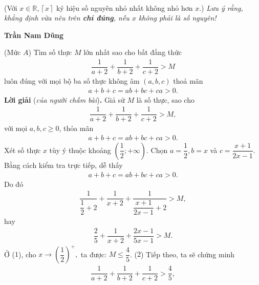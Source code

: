 \begin{multicols}{2}
\begin{align*}
	\end{align*}
	(Với $x \in \mathbb{R}, \left\lceil x \right\rceil $    ký hiệu số nguyên nhỏ nhất không nhỏ hơn $x$.)
	\vskip 0.05cm
	\textit{Lưu ý rằng, khẳng định vừa nêu trên \textbf{\color{thachthuctoanhoc}chỉ đúng}, nếu $x$ không phải là số nguyên!}
	\begin{flushright}
		\textbf{\color{thachthuctoanhoc}Trần Nam Dũng}
	\end{flushright}
	{}
	(Mức $A$) Tìm số thực $M$ lớn nhất sao cho bất đẳng thức 
	\begin{align*}
		\dfrac{1}{{a + 2}} + \dfrac{1}{{b + 2}} + \dfrac{1}{{c + 2}} > M
	\end{align*}
	luôn đúng với mọi bộ ba số thực không âm $(a,b,c)$ thoả mãn  
	\begin{align*}
		a+b+c=ab+bc+ca>0.
	\end{align*}
	\textbf{\color{thachthuctoanhoc}Lời giải} (\textit{của người chấm bài})\textbf{\color{thachthuctoanhoc}.}
	\vskip 0.05cm
	Giả sử $M$ là số thực, sao cho
	\begin{align*}
		\dfrac{1}{{a + 2}} + \dfrac{1}{{b + 2}} + \dfrac{1}{{c + 2}} > M,
	\end{align*}
	với mọi $a, b, c \ge  0$, thỏa mãn 
	\begin{align*}
		a + b + c = ab + bc + ca > 0.
	\end{align*}
	Xét số thực $x$ tùy ý thuộc khoảng $\left( {\dfrac{1}{2}; + \infty } \right).$
	\vskip 0.05cm 
	Chọn  $a = \dfrac{1}{2}, b = x$ và $c = \dfrac{x+1}{2x-1}$.
	\vskip 0.05cm
	Bằng cách kiểm tra trực tiếp, dễ thấy
	\begin{align*}
		a + b + c = ab + bc + ca > 0.
	\end{align*}
	Do đó
	\begin{align*}
		\dfrac{1}{{\dfrac{1}{2} + 2}} + \dfrac{1}{{x + 2}} + \dfrac{1}{{\dfrac{{x + 1}}{{2x - 1}} + 2}} > M,
	\end{align*}
	hay                                                                         \begin{align*}
		\dfrac{2}{5} + \dfrac{1}{{x + 2}} + \dfrac{{2x - 1}}{{5x - 1}} > M. \tag{$1$}
	\end{align*}
	Ở ($1$), cho $x \to {\left( {\dfrac{1}{2}} \right)^ + },$ ta được: $M \le \dfrac{4}{5}$. \hfill ($2$)
	\vskip 0.05cm
	Tiếp theo, ta sẽ chứng minh
	\begin{align*}
		\dfrac{1}{{a + 2}} + \dfrac{1}{{b + 2}} + \dfrac{1}{{c + 2}} > \dfrac{4}{5}, \tag{$3$}
	\end{align*}

\end{multicols}

